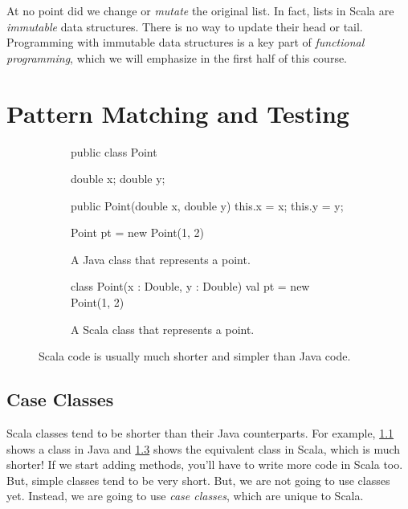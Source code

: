 \documentclass[9pt]{extbook}
\begin{document}
At no point did we change or \emph{mutate} the original list. In fact, lists in
Scala are \emph{immutable} data structures. There is no way to update their
head or tail. Programming with immutable data structures is a key part of
\emph{functional programming}, which we will emphasize in the first half
of this course.

\chapter{Pattern Matching and Testing}

\lstset{language=scala}

\begin{figure}
\begin{subfigure}[b]{.45\textwidth}
\begin{javacode}
public class Point {

  double x;
  double y;

  public Point(double x, double y) {
    this.x = x;
    this.y = y;
  }

}

Point pt = new Point(1, 2)
\end{javacode}
\caption{A Java class that represents a point.}\label{javapoint}
\end{subfigure}
\quad\vrule\quad
%
\begin{subfigure}[b]{.45\textwidth}
\begin{scalacode}
class Point(x : Double, y : Double)
val pt = new Point(1, 2)
\end{scalacode}
\caption{A Scala class that represents a point.}\label{scalapoint}
\end{subfigure}
\caption{Scala code is usually much shorter and simpler than Java code.}
\end{figure}

\section{Case Classes}

Scala classes tend to be shorter than their
Java counterparts. For example, \cref{javapoint} shows a  class
in Java and \cref{scalapoint} shows the equivalent class in Scala, which
is much shorter!
If we start adding methods, you'll have to write
more code in Scala too. But, simple classes tend to be very short.
But, we are not going to use classes yet. Instead, we are going to use
\emph{case classes}, which are unique to Scala.
\end{document}
